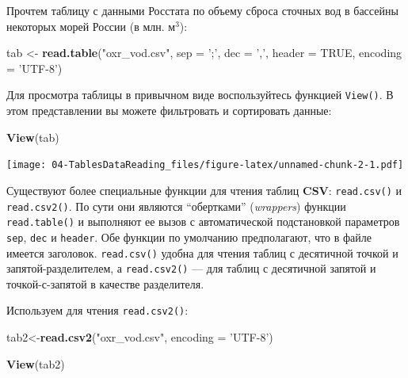 \documentclass[]{book}
\newenvironment{Shaded}{\begin{snugshade}}{\end{snugshade}}
\newcommand{\KeywordTok}[1]{\textcolor[rgb]{0.13,0.29,0.53}{\textbf{#1}}}
\newcommand{\DataTypeTok}[1]{\textcolor[rgb]{0.13,0.29,0.53}{#1}}
\newcommand{\StringTok}[1]{\textcolor[rgb]{0.31,0.60,0.02}{#1}}
\newcommand{\OtherTok}[1]{\textcolor[rgb]{0.56,0.35,0.01}{#1}}
\newcommand{\NormalTok}[1]{#1}
\begin{document}
Прочтем таблицу с данными Росстата по объему сброса сточных вод в
бассейны некоторых морей России (в млн. м\(^3\)):

\begin{Shaded}
\begin{Highlighting}[]
\NormalTok{tab <-}\StringTok{ }\KeywordTok{read.table}\NormalTok{(}\StringTok{"oxr_vod.csv"}\NormalTok{,}
                  \DataTypeTok{sep =} \StringTok{';'}\NormalTok{,}
                  \DataTypeTok{dec =} \StringTok{','}\NormalTok{,}
                  \DataTypeTok{header =} \OtherTok{TRUE}\NormalTok{,}
                  \DataTypeTok{encoding =} \StringTok{'UTF-8'}\NormalTok{)}
\end{Highlighting}
\end{Shaded}

Для просмотра таблицы в привычном виде воспользуйтесь функцией
\texttt{View()}. В этом представлении вы можете фильтровать и
сортировать данные:

\begin{Shaded}
\begin{Highlighting}[]
\KeywordTok{View}\NormalTok{(tab)}
\end{Highlighting}
\end{Shaded}

\texttt{[image: 04-TablesDataReading\_files/figure-latex/unnamed-chunk-2-1.pdf]}

Существуют более специальные функции для чтения таблиц \textbf{CSV}:
\texttt{read.csv()} и \texttt{read.csv2()}. По сути они являются
``обертками'' (\emph{wrappers}) функции \texttt{read.table()} и
выполняют ее вызов с автоматической подстановкой параметров
\texttt{sep}, \texttt{dec} и \texttt{header}. Обе функции по умолчанию
предполагают, что в файле имеется заголовок. \texttt{read.csv()} удобна
для чтения таблиц с десятичной точкой и запятой-разделителем, а
\texttt{read.csv2()} --- для таблиц с десятичной запятой и
точкой-с-запятой в качестве разделителя.

Используем для чтения \texttt{read.csv2()}:

\begin{Shaded}
\begin{Highlighting}[]
\NormalTok{tab2<-}\KeywordTok{read.csv2}\NormalTok{(}\StringTok{"oxr_vod.csv"}\NormalTok{, }\DataTypeTok{encoding =} \StringTok{'UTF-8'}\NormalTok{)}
\end{Highlighting}
\end{Shaded}

\begin{Shaded}
\begin{Highlighting}[]
\KeywordTok{View}\NormalTok{(tab2)}
\end{Highlighting}
\end{Shaded}
\end{document}
